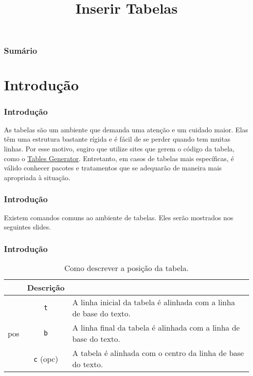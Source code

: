 \documentclass[brazilian]{beamer}
\title{Inserir Tabelas}
\begin{document}
\frame{\titlepage}

\begin{frame}
  \frametitle{Sumário}
  \tableofcontents
\end{frame}

\section{Introdução}
\begin{frame}
  \frametitle{Introdução}

  As tabelas são um ambiente que demanda uma atenção e um cuidado maior. Elas têm uma estrutura bastante rígida e é fácil de se perder quando tem muitas linhas. Por esse motivo, sugiro que utilize sites que gerem o código da tabela, como o \href{https://www.tablesgenerator.com/}{Tables Generator}. Entretanto, em casos de tabelas mais específicas, é válido conhecer pacotes e tratamentos que se adequarão de maneira mais apropriada à situação.

\end{frame}

\begin{frame}
  \frametitle{Introdução}

  Existem comandos comuns ao ambiente de tabelas. Eles serão mostrados nos seguintes slides.

\end{frame}

\begin{frame}[fragile]
  \frametitle{Introdução}


  \begin{table}
    \caption{Como descrever a posição da tabela.}
    \label{tab:Posicao}
    \begin{tabular}[c]{c|c|m{8cm}}
      \firsthline
      \multicolumn{2}{c}{Comando} & Descrição                                                                             \\ \hline
      \multirow{3}{*}{pos}        & \texttt{t}       & A linha inicial da tabela é alinhada com a linha de base do texto. \\ \cline{2-3}
                                  & \texttt{b}       & A linha final da tabela é alinhada com a linha de base do texto.   \\ \cline{2-3}
                                  & \texttt{c} (opc) & A tabela é alinhada com  o centro da linha de base do texto.       \\ \hline
    \end{tabular}
  \end{table}

\end{frame}
\end{document}
